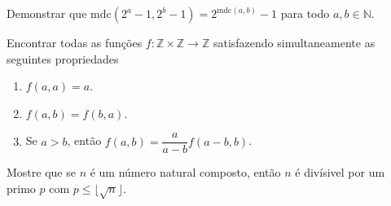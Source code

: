 \documentclass[english]{IMTexam}
\begin{document}
\begin{questions}
\begin{parts}
			\begin{solution}
				
			\end{solution}
			
		\end{parts}
	
		\question\label{ques:BMST:1.19} Demonstrar que $ \mathrm{mdc}(2^{a}-1,2^{b}-1)=2^{\mathrm{mdc}(a,b)}-1 $ para todo $ a,b\in\mathbb{N} $.
		
		\begin{solution}
			
		\end{solution}
		
		\question\label{ques:BMST:1.20} Encontrar todas as funções $ f:\mathbb{Z}\times \mathbb{Z}\longrightarrow \mathbb{Z} $ satisfazendo simultaneamente as seguintes propriedades
		\begin{enumerate}[label=(\roman*)]
			\item\label{part:BMST:1.20a} $ f(a,a)=a $.
			\item\label{part:BMST:1.20b} $ f(a,b)=f(b,a) $.
			\item\label{part:BMST:1.20c} Se $ a>b $, então $ f(a,b)=\dfrac{a}{a-b}f(a-b,b) $.
		\end{enumerate}
		
		\begin{solution}
			
		\end{solution}
	
		\question\label{ques:BMST:1.21} Mostre que se $ n $ é um número natural composto, então $ n $ é divísivel por um primo $ p $ com $ p\leqslant \lfloor \sqrt{n}\rfloor $.
		
		\begin{solution}
			
		\end{solution}
		
	\end{questions}
\end{document}
